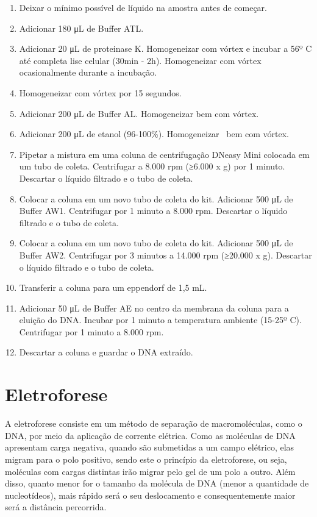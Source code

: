 \documentclass[
  letterpaper,
  DIV=11,
  numbers=noendperiod]{scrreprt}
\begin{document}
\begin{enumerate}
\def\labelenumi{\arabic{enumi}.}
\item
  Deixar o mínimo possível de líquido na amostra antes de começar.
\item
  Adicionar 180 μL de Buffer ATL.
\item
  Adicionar 20 μL de proteinase K. Homogeneizar com vórtex e incubar a
  56º C até completa lise celular (30min - 2h). Homogeneizar com vórtex
  ocasionalmente durante a incubação.
\item
  Homogeneizar com vórtex por 15 segundos.
\item
  Adicionar 200 μL de Buffer AL. Homogeneizar bem com vórtex.
\item
  Adicionar 200 μL de etanol (96-100\%). Homogeneizar~ bem com vórtex.
\item
  Pipetar a mistura em uma coluna de centrifugação DNeasy Mini colocada
  em um tubo de coleta. Centrifugar a 8.000 rpm (≥6.000 x g) por 1
  minuto. Descartar o líquido filtrado e o tubo de coleta.
\item
  Colocar a coluna em um novo tubo de coleta do kit. Adicionar 500 μL de
  Buffer AW1. Centrifugar por 1 minuto a 8.000 rpm. Descartar o líquido
  filtrado e o tubo de coleta.
\item
  Colocar a coluna em um novo tubo de coleta do kit. Adicionar 500 μL de
  Buffer AW2. Centrifugar por 3 minutos a 14.000 rpm (≥20.000 x g).
  Descartar o líquido filtrado e o tubo de coleta.
\item
  Transferir a coluna para um eppendorf de 1,5 mL.
\item
  Adicionar 50 μL de Buffer AE no centro da membrana da coluna para a
  eluição do DNA. Incubar por 1 minuto a temperatura ambiente (15-25º
  C). Centrifugar por 1 minuto a 8.000 rpm.
\item
  Descartar a coluna e guardar o DNA extraído.
\end{enumerate}

\hypertarget{eletroforese}{%
\chapter{Eletroforese}\label{eletroforese}}

A eletroforese consiste em um método de separação de macromoléculas,
como o DNA, por meio da aplicação de corrente elétrica. Como as
moléculas de DNA apresentam carga negativa, quando são submetidas a um
campo elétrico, elas migram para o polo positivo, sendo este o princípio
da eletroforese, ou seja, moléculas com cargas distintas irão migrar
pelo gel de um polo a outro. Além disso, quanto menor for o tamanho da
molécula de DNA (menor a quantidade de nucleotídeos), mais rápido será o
seu deslocamento e consequentemente maior será a distância percorrida.
\end{document}
